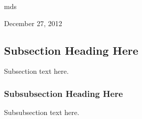 \documentclass[journal]{IEEEtran}
\begin{document}
\hfill mds
 
\hfill December 27, 2012

\subsection{Subsection Heading Here}
Subsection text here.


\subsubsection{Subsubsection Heading Here}
Subsubsection text here.


%
%



%
%
\end{document}
